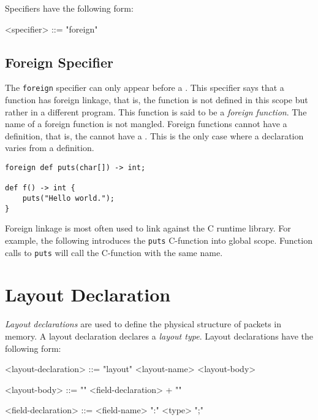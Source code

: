 Specifiers have the following form:

\begin{grammar}
\singlespace
<specifier> ::= "foreign"
\end{grammar}

\subsection{Foreign Specifier} \label{guide:foreign_spec}

The \texttt{foreign} specifier can only appear before a . This specifier says that a function has foreign linkage, that is, the function is not defined in this scope but rather in a different program. This function is said to be a \textit{foreign function}. The name of a foreign function is not mangled. Foreign functions cannot have a definition, that is, the  cannot have a . This is the only case where a declaration varies from a definition.

\begin{minip}
\begin{lstlisting}
foreign def puts(char[]) -> int;

def f() -> int {
	puts("Hello world.");
}
\end{lstlisting}
\end{minip}

Foreign linkage is most often used to link against the C runtime library. For example, the following introduces the \texttt{puts} C-function into global scope. Function calls to \texttt{puts} will call the C-function with the same name.
 
\section{Layout Declaration} \label{guide:layout}

\textit{Layout declarations} are used to define the physical structure of packets in memory. A layout declaration declares a \textit{layout type}. Layout declarations have the following form:

\begin{minip}
\begin{grammar}
<layout-declaration> ::=
"layout" <layout-name> <layout-body>

<layout-body> ::=
"{"
	<field-declaration> +
"}"

<field-declaration> ::=
<field-name> ":" <type> ";"
\end{grammar}
\end{minip}

